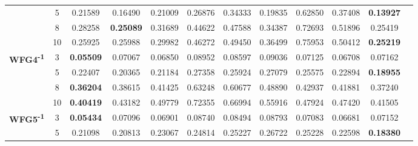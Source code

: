 \documentclass{sig-alternate}
\begin{document}
\begin{table}[!htb]
\begin{tabular}{|c|c|c|c|c|c|c|c|c|c|c|c|}
                                                      & 5          & 0.21589          & 0.16490           & 0.21009               & 0.26876          & 0.34333             & 0.19835             & 0.62850            & 0.37408              & \textbf{0.13927} \\ \cline{2-11} 
                                                      & 8          & 0.28258          & \textbf{0.25089}  & 0.31689               & 0.44622          & 0.47588             & 0.34387             & 0.72693            & 0.51896              & 0.25419          \\ \cline{2-11} 
                                                      & 10         & 0.25925          & 0.25988           & 0.29982               & 0.46272          & 0.49450             & 0.36499             & 0.75953            & 0.50412              & \textbf{0.25219} \\ \hline
\multirow{4}{*}{\textbf{WFG4\textsuperscript{-1}}}  & 3          & \textbf{0.05509} & 0.07067           & 0.06850               & 0.08952          & 0.08597             & 0.09036             & 0.07125            & 0.06708              & 0.07162          \\ \cline{2-11} 
                                                      & 5          & 0.22407          & 0.20365           & 0.21184               & 0.27358          & 0.25924             & 0.27079             & 0.25575            & 0.22894              & \textbf{0.18955} \\ \cline{2-11} 
                                                      & 8          & \textbf{0.36204} & 0.38615           & 0.41425               & 0.63248          & 0.60677             & 0.48890             & 0.42937            & 0.41881              & 0.37240          \\ \cline{2-11} 
                                                      & 10         & \textbf{0.40419} & 0.43182           & 0.49779               & 0.72355          & 0.66994             & 0.55916             & 0.47924            & 0.47420              & 0.41505          \\ \hline
\multirow{4}{*}{\textbf{WFG5\textsuperscript{-1}}}  & 3          & \textbf{0.05434} & 0.07096           & 0.06901               & 0.08740          & 0.08494             & 0.08793             & 0.07083            & 0.06681              & 0.07152          \\ \cline{2-11} 
                                                      & 5          & 0.21098          & 0.20813           & 0.23067               & 0.24814          & 0.25227             & 0.26722             & 0.25228            & 0.22598              & \textbf{0.18380} \\ \cline{2-11} 

\end{tabular}
\end{table}
\end{document}
